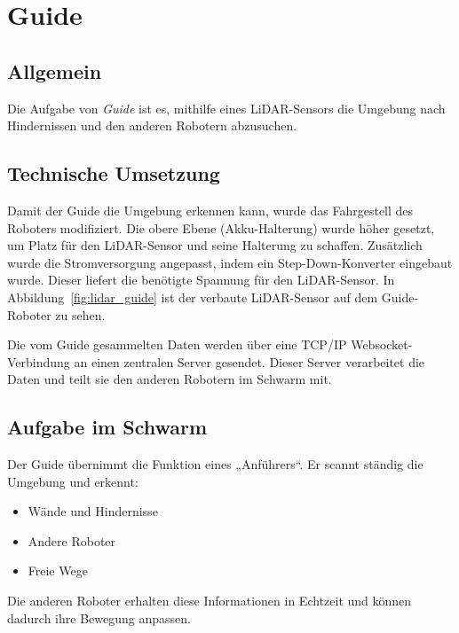 


\section{Guide}
\label{subsec:hardware_guide}
\subsection{Allgemein}
Die Aufgabe von \textit{Guide} ist es, mithilfe eines LiDAR-Sensors die Umgebung nach Hindernissen und den anderen Robotern abzusuchen.


\subsection{Technische Umsetzung}
Damit der Guide die Umgebung erkennen kann, wurde das Fahrgestell des Roboters modifiziert. Die obere Ebene (Akku-Halterung) wurde höher gesetzt, um Platz für den LiDAR-Sensor und seine Halterung zu schaffen. Zusätzlich wurde die Stromversorgung angepasst, indem ein Step-Down-Konverter eingebaut wurde. Dieser liefert die benötigte Spannung für den LiDAR-Sensor. In Abbildung~\ref{fig:lidar_guide} ist der verbaute LiDAR-Sensor auf dem Guide-Roboter zu sehen.

Die vom Guide gesammelten Daten werden über eine TCP/IP Websocket-Verbindung an einen zentralen Server gesendet. Dieser Server verarbeitet die Daten und teilt sie den anderen Robotern im Schwarm mit.

\subsection{Aufgabe im Schwarm}
Der Guide übernimmt die Funktion eines „Anführers“. Er scannt ständig die Umgebung und erkennt:
\begin{itemize}
    \item Wände und Hindernisse
    \item Andere Roboter
    \item Freie Wege
\end{itemize}
Die anderen Roboter erhalten diese Informationen in Echtzeit und können dadurch ihre Bewegung anpassen.

